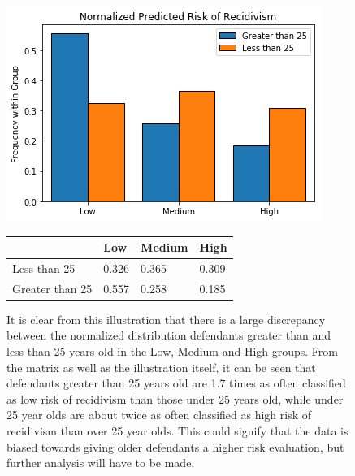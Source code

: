 \documentclass[11pt, fleqn, titlepage]{article}
\begin{document}
			\begin{figure}[H]
			\centering
			\includegraphics[width=0.5\linewidth]{imgs/normalized_recid_age}	
			\begin{table}[H]
				\centering
				\begin{tabular}{|l|l|l|l|}
					\hline
					& Low   & Medium & High  \\ \hline
					Less than 25    & 0.326 & 0.365  & 0.309 \\ \hline
					Greater than 25 & 0.557 & 0.258  & 0.185 \\ \hline
				\end{tabular}
			\end{table}
			\caption{It is clear from this illustration that there is a large discrepancy between the normalized distribution defendants greater than and less than 25 years old in the Low, Medium and High groups. From the matrix as well as the illustration itself, it can be seen that defendants greater than 25 years old are 1.7 times as often classified as low risk of recidivism than those under 25 years old, while under 25 year olds are about twice as often classified as high risk of recidivism than over 25 year olds. This could signify that the data is biased towards giving older defendants a higher risk evaluation, but further analysis will have to be made.}
			\label{fig:predictedrecidage}
		\end{figure}
	
\end{document}
